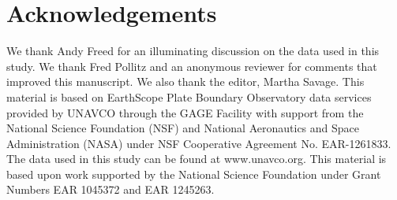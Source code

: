 \section{Acknowledgements}
We thank Andy Freed for an illuminating discussion on the data used in
this study.  We thank Fred Pollitz and an anonymous reviewer for
comments that improved this manuscript. We also thank the editor,
Martha Savage.  This material is based on EarthScope Plate Boundary
Observatory data services provided by UNAVCO through the GAGE Facility
with support from the National Science Foundation (NSF) and National
Aeronautics and Space Administration (NASA) under NSF Cooperative
Agreement No. EAR-1261833.  The data used in this study can be found
at www.unavco.org. This material is based upon work supported by the
National Science Foundation under Grant Numbers EAR 1045372 and EAR
1245263.



